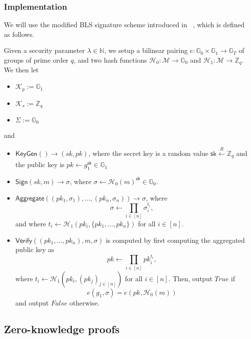 \documentclass[runningheads]{llncs}
\newcommand{\K}{\mathcal{K}}
\newcommand{\M}{\mathcal{M}}
\newcommand{\Z}{\mathbb{Z}}
\newcommand{\N}{\mathbb{N}}
\begin{document}
\subsubsection{Implementation}

We will use the modified BLS signature scheme introduced in ~\cite{bdn18}, which is defined as follows.

Given a security parameter \(\lambda \in \N\), we setup a bilinear pairing $e: \mathbb{G}_{0} \times \mathbb{G}_{1}\rightarrow \mathbb{G}_{T}$ of groups of prime order \(q\), and two hash functions \(\mathcal{H}_0: \M \to \mathbb{G}_{0}\) and \(\mathcal{H}_1: \M \to \Z_q\). We then let

\begin{itemize}
  \item \(\K_p := \mathbb{G}_1\)
  \item \(\K_s := \mathbb{Z}_q\)
  \item \(\Sigma := \mathbb{G}_0\)
\end{itemize}

and

\begin{itemize}
  \setlength\itemsep{0.35em}
    \item $\mathsf{KeyGen}() \to (sk, pk)$, where the secret key is a random value $\mathsf{sk} \xleftarrow[]{R}\mathbb{Z}_{q}$ and the public key is $pk \leftarrow g_{1}^{\mathsf{sk}} \in \mathbb{G}_{1}$
    \item $\mathsf{Sign}(sk, m) \to \sigma$, where $\sigma \leftarrow \mathcal{H}_{0}(m)^{\mathsf{sk}} \in \mathbb{G}_{0}$.
    \item \(\mathsf{Aggregate}((pk_1,\sigma_1),\dots,(pk_n,\sigma_n)) \to \sigma\), where \[\sigma \leftarrow \prod_{i \in [n]} \sigma_i^{t_i},\] and where \(t_i \leftarrow \mathcal{H}_1(pk_i, \{pk_1, \dots, pk_n\})\) for all \(i \in [n]\).
    \item $\mathsf{Verify}((pk_1, \dots, pk_n), m, \sigma)$ is computed by first computing the aggregated public key as \[pk \leftarrow \prod_{i \in [n]} pk_i^{t_i},\] where \(t_i \leftarrow \mathcal{H}_1(pk_i, (pk_j)_{j \in [n]})\) for all \(i \in [n]\). Then, output \(True\) if \[e(g_1, \sigma) = e(pk, \mathcal{H}_0(m))\] and output \(False\) otherwise.
\end{itemize}

\subsection{Zero-knowledge proofs}
\end{document}
